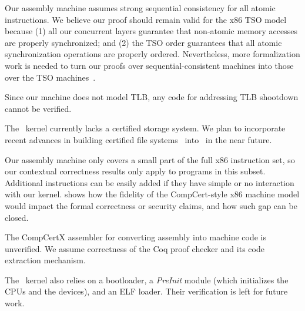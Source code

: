 Our assembly machine assumes strong sequential consistency for all
atomic instructions. We believe our proof should remain valid for
the x86 TSO model because (1) all our concurrent layers guarantee that
non-atomic memory accesses are properly synchronized; and (2) the TSO
order guarantees that all atomic synchronization operations are
properly ordered. Nevertheless,
more formalization work is needed to turn our proofs over
sequential-consistent machines into those over the TSO
machines~\cite{vontessin13}.

Since our machine does not model TLB, any code for addressing TLB
shootdown cannot be verified.

The \mCTOS\ kernel currently lacks a certified storage system.
We plan to incorporate recent advances in building
certified file systems~\cite{fscq15,cogent16} into \mCTOS\ in the near future.

Our assembly machine only covers a small part of the full x86
instruction set, so our contextual correctness results only apply to
programs in this subset. Additional instructions 
can be easily added if they have simple or no interaction with our
kernel.  \citet[Sec. 6]{costanzo16} shows how the fidelity of the
CompCert-style x86 machine model would impact the formal correctness
or security claims, and how such gap can be closed.

The CompCertX assembler for converting assembly into machine code is
unverified. We assume correctness of the Coq proof checker
and its code extraction mechanism.

The \mCTOS\ kernel also relies on a bootloader, a {\it PreInit}
module (which initializes the CPUs and the devices), and an ELF
loader. Their verification is left for future work. 




